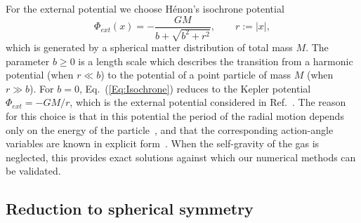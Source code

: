 For the external potential we choose H\'enon's isochrone potential~\cite{mH59,jB14,BinneyTremaine-Book}
\begin{equation}
\Phi_{ext}(x) = -\frac{GM}{b + \sqrt{b^2 + r^2}},\qquad r := |x|,
\label{Eq:Isochrone}
\end{equation}
which is generated by a spherical matter distribution of total mass $M$. The parameter $b\geq 0$ is a length scale which describes the transition from a harmonic potential (when $r\ll b$) to the potential of a point particle of mass $M$ (when $r\gg b$). For $b = 0$, Eq.~(\ref{Eq:Isochrone}) reduces to the Kepler potential $\Phi_{ext} = -GM/r$, which is the external potential considered in Ref.~\cite{mHgRmScS25}. The reason for this choice is that in this potential the period of the radial motion depends only on the energy of the particle~\cite{mH59,jB14}, and that the corresponding action-angle variables are known in explicit form~\cite{BinneyTremaine-Book}. When the self-gravity of the gas is neglected, this provides exact solutions against which our numerical methods can be validated.


\subsection{Reduction to spherical symmetry}
\label{SubSec:SphSym}

